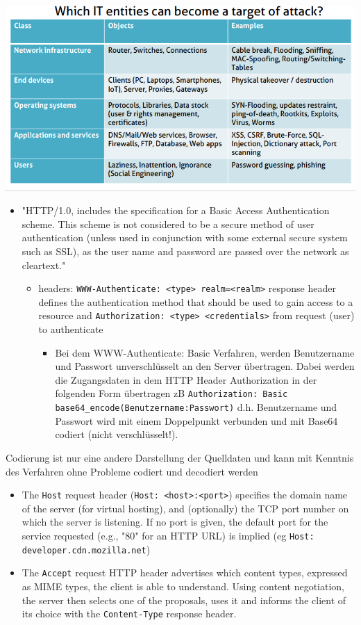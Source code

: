 \documentclass[11pt]{article}
\begin{document}
\begin{center}
\includegraphics[width=.9\linewidth]{./F3.png}
\end{center}
\begin{itemize}
\item "HTTP/1.0, includes the specification for a Basic Access Authentication scheme. This scheme is not considered to be a secure method of user authentication (unless used in conjunction with some external secure system such as SSL), as the user name and password are passed over the network as cleartext."
\begin{itemize}
\item headers: \texttt{WWW-Authenticate: <type> realm=<realm>} response header defines the authentication method that should be used to gain access to a resource and \texttt{Authorization: <type> <credentials>} from request (user) to authenticate
\begin{itemize}
\item Bei dem WWW-Authenticate: Basic Verfahren, werden Benutzername und Passwort unverschlüsselt an den Server übertragen. Dabei werden die Zugangsdaten in dem HTTP Header Authorization in der folgenden Form übertragen zB \texttt{Authorization: Basic base64\_encode(Benutzername:Passwort)} d.h. Benutzername und Passwort wird mit einem Doppelpunkt verbunden und mit Base64 codiert (nicht verschlüsselt!).
\end{itemize}
\end{itemize}
\end{itemize}
Codierung ist nur eine andere Darstellung der Quelldaten und kann mit Kenntnis des Verfahren ohne Probleme codiert und decodiert werden

\begin{itemize}
\item The \texttt{Host} request header (\texttt{Host: <host>:<port>}) specifies the domain name of the server (for virtual hosting), and (optionally) the TCP port number on which the server is listening. If no port is given, the default port for the service requested (e.g., "80" for an HTTP URL) is implied (eg \texttt{Host: developer.cdn.mozilla.net})
\item The \texttt{Accept} request HTTP header advertises which content types, expressed as MIME types, the client is able to understand. Using content negotiation, the server then selects one of the proposals, uses it and informs the client of its choice with the \texttt{Content-Type} response header.
\end{itemize}
\end{document}
